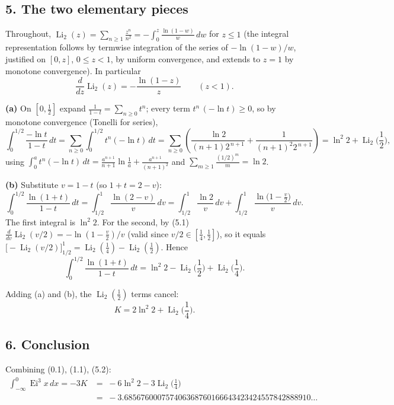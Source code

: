 \documentclass[11pt]{article}
\theoremstyle{remark}
\begin{document}
\subsection*{5. The two elementary pieces}

Throughout, $\operatorname{Li}_2(z)=\sum_{n\ge1}\frac{z^{n}}{n^{2}}=-\int_{0}^{z}\frac{\ln(1-w)}{w}\,dw$ for $z\le 1$ (the integral representation follows by termwise integration of the series of $-\ln(1-w)/w$, justified on $[0,z]$, $0\le z<1$, by uniform convergence, and extends to $z=1$ by monotone convergence). In particular
\begin{equation}\frac{d}{dz}\operatorname{Li}_{2}(z)=-\frac{\ln(1-z)}{z}\qquad(z<1).
\tag{5.1}\end{equation}

\textbf{(a)} On $[0,\tfrac12]$ expand $\frac{1}{1-t}=\sum_{n\ge0}t^{n}$; every term $t^{n}\,(-\ln t)\ge0$, so by monotone convergence (Tonelli for series),
$$\int_{0}^{1/2}\frac{-\ln t}{1-t}\,dt=\sum_{n\ge0}\int_{0}^{1/2}t^{n}(-\ln t)\,dt
=\sum_{n\ge0}\left(\frac{\ln 2}{(n+1)2^{\,n+1}}+\frac{1}{(n+1)^{2}2^{\,n+1}}\right)
=\ln^{2}2+\operatorname{Li}_{2}\!\Big(\frac12\Big),$$
using $\int_{0}^{a}t^{n}(-\ln t)\,dt=\frac{a^{n+1}}{n+1}\ln\frac1a+\frac{a^{n+1}}{(n+1)^{2}}$ and $\sum_{m\ge1}\frac{(1/2)^{m}}{m}=\ln 2$.

\textbf{(b)} Substitute $v=1-t$ (so $1+t=2-v$):
$$\int_{0}^{1/2}\frac{\ln(1+t)}{1-t}\,dt=\int_{1/2}^{1}\frac{\ln(2-v)}{v}\,dv
=\int_{1/2}^{1}\frac{\ln 2}{v}\,dv+\int_{1/2}^{1}\frac{\ln\!\big(1-\frac v2\big)}{v}\,dv .$$
The first integral is $\ln^{2}2$. For the second, by (5.1) $\frac{d}{dv}\operatorname{Li}_2(v/2)=-\ln(1-\frac v2)/v$ (valid since $v/2\in[\tfrac14,\tfrac12]$), so it equals $\big[-\operatorname{Li}_{2}(v/2)\big]_{1/2}^{1}=\operatorname{Li}_{2}(\tfrac14)-\operatorname{Li}_{2}(\tfrac12)$. Hence
$$\int_{0}^{1/2}\frac{\ln(1+t)}{1-t}\,dt=\ln^{2}2-\operatorname{Li}_{2}\!\Big(\frac12\Big)+\operatorname{Li}_{2}\!\Big(\frac14\Big).$$

Adding (a) and (b), the $\operatorname{Li}_{2}(\tfrac12)$ terms cancel:
\begin{equation}K=2\ln^{2}2+\operatorname{Li}_{2}\!\Big(\frac14\Big).
\tag{5.2}\end{equation}

\subsection*{6. Conclusion}

Combining (0.1), (1.1), (5.2):
$$\begin{aligned}
\int_{-\infty}^{0}\operatorname{Ei}^{3}x\,dx=-3K
&=\;-6\ln^{2}2-3\operatorname{Li}_{2}\!\Big(\frac14\Big)\\
&=\;-3.685676000757406368760166643423424557842888910\ldots
\end{aligned}$$
\end{document}
